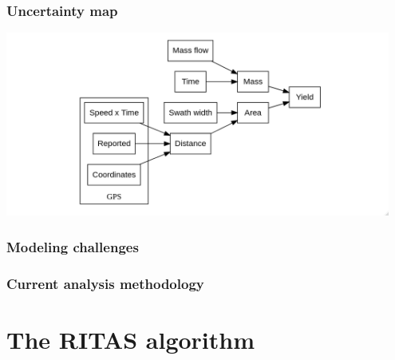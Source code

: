 \documentclass{beamer}
\begin{document}
\begin{frame}
  \frametitle{Uncertainty map}

  \includegraphics[width=0.95\textwidth]{./figures/uncertainty.png}
  
  
\end{frame}

\begin{frame}
  \frametitle{Modeling challenges}


\end{frame}

\begin{frame}
  \frametitle{Current analysis methodology}

  
\end{frame}


\section{The RITAS algorithm}
\end{document}
